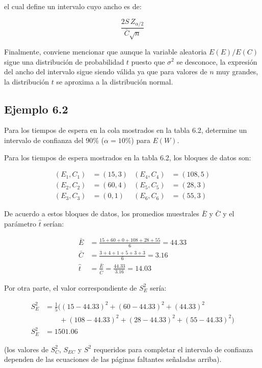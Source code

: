 \documentclass[11pt,letterpaper]{report}
\begin{document}
el cual define un intervalo cuyo ancho es de:

\begin{equation}
\frac{2S\,Z_{\alpha/2}}{\bar{C}\sqrt{n}}
\end{equation}

Finalmente, conviene mencionar que aunque la variable aleatoria
$E(E)/E(C)$ sigue una distribución de probabilidad $t$ puesto que
$\sigma^2$ se desconoce, la expresión del ancho del intervalo sigue
siendo válida ya que para valores de $n$ muy grandes, la distribución
$t$ se aproxima a la distribución normal.

\subsection*{Ejemplo 6.2}

Para los tiempos de espera en la cola mostrados en la tabla 6.2,
determine un intervalo de confianza del 90\% ($\alpha=10\%$) para
$E(W)$.

Para los tiempos de espera mostrados en la tabla 6.2, los bloques de
datos son:

\begin{align*}
(E_1,C_1) &= (15,3) & (E_4,C_4) &= (108,5) \\
(E_2,C_2) &= (60,4) & (E_5,C_5) &= (28,3) \\
(E_3,C_3) &= (0,1) & (E_6,C_6) &= (55,3)
\end{align*}

De acuerdo a estos bloques de datos, los promedios muestrales $\bar{E}$
y $\bar{C}$ y el parámetro $\hat{t}$ serían:

\begin{align*}
\bar{E} &= \frac{15+60+0+108+28+55}{6} = 44.33 \\
\bar{C} &= \frac{3+4+1+5+3+3}{6} = 3.16 \\
\hat{t} &= \frac{\bar{E}}{\bar{C}} = \frac{44.33}{3.16} = 14.03
\end{align*}

Por otra parte, el valor correspondiente de $S_E^2$ sería:

\begin{align*}
S_E^2 &= \frac{1}{5}\Big( (15-44.33)^2 + (60-44.33)^2 + (44.33)^2 \\
&\qquad + (108-44.33)^2 + (28-44.33)^2 + (55-44.33)^2 \Big) \\
S_E^2 &= 1501.06
\end{align*}

(los valores de $S_C^2$, $S_{EC}$ y $S^2$ requeridos para completar el
intervalo de confianza dependen de las ecuaciones de las páginas
faltantes señaladas arriba).
\end{document}
